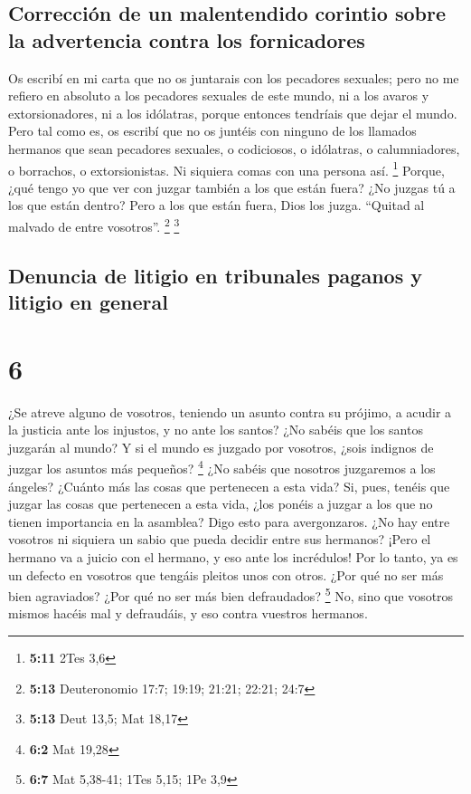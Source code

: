 \hypertarget{correcciuxf3n-de-un-malentendido-corintio-sobre-la-advertencia-contra-los-fornicadores}{%
\subsection{Corrección de un malentendido corintio sobre la advertencia
contra los
fornicadores}\label{correcciuxf3n-de-un-malentendido-corintio-sobre-la-advertencia-contra-los-fornicadores}}

 Os escribí en mi carta que no os juntarais con los
pecadores sexuales;  pero no me refiero en absoluto a los
pecadores sexuales de este mundo, ni a los avaros y extorsionadores, ni
a los idólatras, porque entonces tendríais que dejar el mundo.
 Pero tal como es, os escribí que no os juntéis con
ninguno de los llamados hermanos que sean pecadores sexuales, o
codiciosos, o idólatras, o calumniadores, o borrachos, o extorsionistas.
Ni siquiera comas con una persona así. \footnote{\textbf{5:11} 2Tes 3,6}
 Porque, ¿qué tengo yo que ver con juzgar también a los
que están fuera? ¿No juzgas tú a los que están dentro? 
Pero a los que están fuera, Dios los juzga. ``Quitad al malvado de entre
vosotros''. \footnote{\textbf{5:13} Deuteronomio 17:7; 19:19; 21:21;
  22:21; 24:7} \footnote{\textbf{5:13} Deut 13,5; Mat 18,17}

\hypertarget{denuncia-de-litigio-en-tribunales-paganos-y-litigio-en-general}{%
\subsection{Denuncia de litigio en tribunales paganos y litigio en
general}\label{denuncia-de-litigio-en-tribunales-paganos-y-litigio-en-general}}

\hypertarget{section-5}{%
\section{6}\label{section-5}}

 ¿Se atreve alguno de vosotros, teniendo un asunto contra
su prójimo, a acudir a la justicia ante los injustos, y no ante los
santos?  ¿No sabéis que los santos juzgarán al mundo? Y si
el mundo es juzgado por vosotros, ¿sois indignos de juzgar los asuntos
más pequeños? \footnote{\textbf{6:2} Mat 19,28}  ¿No
sabéis que nosotros juzgaremos a los ángeles? ¿Cuánto más las cosas que
pertenecen a esta vida?  Si, pues, tenéis que juzgar las
cosas que pertenecen a esta vida, ¿los ponéis a juzgar a los que no
tienen importancia en la asamblea?  Digo esto para
avergonzaros. ¿No hay entre vosotros ni siquiera un sabio que pueda
decidir entre sus hermanos?  ¡Pero el hermano va a juicio
con el hermano, y eso ante los incrédulos!  Por lo tanto,
ya es un defecto en vosotros que tengáis pleitos unos con otros. ¿Por
qué no ser más bien agraviados? ¿Por qué no ser más bien defraudados?
\footnote{\textbf{6:7} Mat 5,38-41; 1Tes 5,15; 1Pe 3,9} 
No, sino que vosotros mismos hacéis mal y defraudáis, y eso contra
vuestros hermanos.

